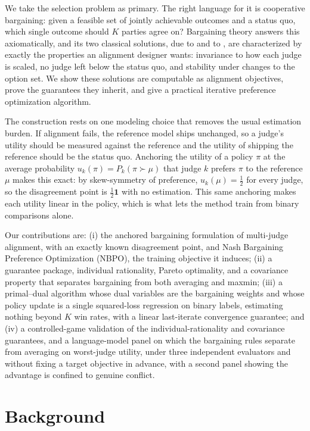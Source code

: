 \documentclass[letterpaper]{article} %
\begin{document}
We take the selection problem as primary. The right language for it is cooperative bargaining: given a feasible set of jointly achievable outcomes and a status quo, which single outcome should $K$ parties agree on? Bargaining theory answers this axiomatically, and its two classical solutions, due to \citet{nash1950} and to \citet{kalai1975}, are characterized by exactly the properties an alignment designer wants: invariance to how each judge is scaled, no judge left below the status quo, and stability under changes to the option set. We show these solutions are computable as alignment objectives, prove the guarantees they inherit, and give a practical iterative preference optimization algorithm.

The construction rests on one modeling choice that removes the usual estimation burden. If alignment fails, the reference model ships unchanged, so a judge's utility should be measured against the reference and the utility of shipping the reference should be the status quo. Anchoring the utility of a policy $\pi$ at the average probability $u_k(\pi)=P_k(\pi\succ\mu)$ that judge $k$ prefers $\pi$ to the reference $\mu$ makes this exact: by skew-symmetry of preference, $u_k(\mu)=\tfrac12$ for every judge, so the disagreement point is $\tfrac12\mathbf 1$ with no estimation. This same anchoring makes each utility linear in the policy, which is what lets the method train from binary comparisons alone.

Our contributions are: (i) the anchored bargaining formulation of multi-judge alignment, with an exactly known disagreement point, and Nash Bargaining Preference Optimization (NBPO), the training objective it induces; (ii) a guarantee package, individual rationality, Pareto optimality, and a covariance property that separates bargaining from both averaging and maxmin; (iii) a primal--dual algorithm whose dual variables are the bargaining weights and whose policy update is a single squared-loss regression on binary labels, estimating nothing beyond $K$ win rates, with a linear last-iterate convergence guarantee; and (iv) a controlled-game validation of the individual-rationality and covariance guarantees, and a language-model panel on which the bargaining rules separate from averaging on worst-judge utility, under three independent evaluators and without fixing a target objective in advance, with a second panel showing the advantage is confined to genuine conflict.

\section{Background}
\end{document}

